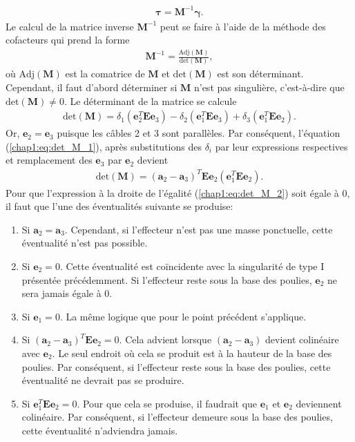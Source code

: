 \begin{align}
\bm{\tau}=\mathbf{M}^{-1}\bm{\gamma}.\label{inv_dyn}
\end{align}
Le calcul de la matrice inverse $\mathbf{M}^{-1}$ peut se faire à l'aide de la méthode des cofacteurs qui prend la forme
\begin{align}
\mathbf{M}^{-1} =  \frac{\text{Adj}(\mathbf{M})}{\text{det}(\mathbf{M})}, \label{M_inv}
\end{align}
où $\text{Adj}(\mathbf{M})$ est la comatrice de $\mathbf{M}$ et $\text{det}(\mathbf{M})$ est son déterminant. Cependant, il faut d'abord déterminer si $\mathbf{M}$ n'est pas singulière, c'est-à-dire que 
$\text{det}(\mathbf{M})\neq 0$. Le déterminant de la matrice se calcule \begin{align}
\text{det}(\mathbf{M})=\delta_1(\mathbf{e}_2^T\mathbf{E}\mathbf{e}_3)-\delta_2(\mathbf{e}_1^T\mathbf{E}\mathbf{e}_3)+\delta_3(\mathbf{e}_1^T\mathbf{E}\mathbf{e}_2). \label{chap1:eq:det_M_1}
\end{align}
Or, $\mathbf{e}_2 = \mathbf{e}_3$ puisque les câbles 2 et 3 sont parallèles. Par conséquent, l'équation (\ref{chap1:eq:det_M_1}), après substitutions des $\delta_i$ par leur expressions respectives et remplacement des $\mathbf{e}_3$ par $\mathbf{e}_2$ devient
\begin{align}
\text{det}(\mathbf{M}) = \left(\mathbf{a}_2-\mathbf{a}_3\right)^T\mathbf{E}\mathbf{e}_2\left(\mathbf{e}_1^T\mathbf{E}\mathbf{e}_2\right)\label{chap1:eq:det_M_2}.
\end{align}
Pour que l'expression à la droite de l'égalité (\ref{chap1:eq:det_M_2}) soit égale à 0, il faut que l'une des éventualités suivante se produise:
\begin{enumerate}
\item Si $\mathbf{a}_2 = \mathbf{a}_3$. Cependant, si l'effecteur n'est pas une masse ponctuelle, cette éventualité n'est pas possible.
\item Si $\mathbf{e}_2=0$. Cette éventualité est coïncidente avec la singularité de type I présentée précédemment. Si l'effecteur reste sous la base des poulies, $\mathbf{e}_2$ ne sera jamais égale à 0.
\item Si $\mathbf{e}_1=0$. La même logique que pour le point précédent s'applique.
\item Si $\left(\mathbf{a}_2-\mathbf{a}_3\right)^T\mathbf{E}\mathbf{e}_2=0$. Cela advient lorsque $\left(\mathbf{a}_2-\mathbf{a}_3\right)$ devient colinéaire avec $\mathbf{e}_2$. Le seul endroit où cela se produit est à la hauteur de la base des poulies. Par conséquent, si l'effecteur reste sous la base des poulies, cette éventualité ne devrait pas se produire. 
\item Si $\mathbf{e}_1^T\mathbf{E}\mathbf{e}_2=0$. Pour que cela se produise, il faudrait que $\mathbf{e}_1$ et $\mathbf{e}_2$ deviennent colinéaire. Par conséquent, si l'effecteur demeure sous la base des poulies, cette éventualité n'adviendra jamais.  
\end{enumerate}
